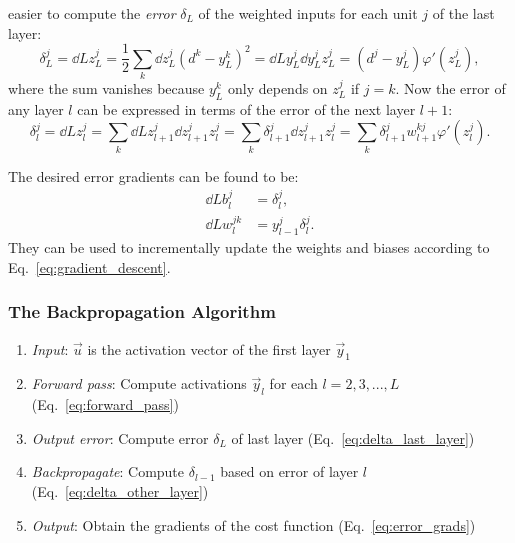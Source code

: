 easier to compute the \emph{error} $\delta_L$ of the weighted inputs for each
unit $j$ of the last layer:
\begin{equation}
  \delta^j_L = \dd{L}{z^j_L} = \frac{1}{2}\sum_k \dd{}{z^j_L}(d^k - y^k_L)^2
             = \dd{L}{y^j_L}\dd{y^j_L}{z^j_L}
             = (d^j - y^j_L) \varphi'(z^j_L) \label{eq:delta_last_layer},
\end{equation}
where the sum vanishes because $y^k_L$ only depends on $z^j_L$ if $j = k$.
Now the error of any layer $l$ can be expressed in terms of the error of the
next layer $l+1$:
\begin{equation}
  \delta^j_{l} = \dd{L}{z^j_l} = \sum_k \dd{L}{z^j_{l+1}}\dd{z^j_{l+1}}{z^j_l}
  = \sum_k \delta^j_{l+1} \dd{z^j_{l+1}}{z^j_l}
  = \sum_k \delta^j_{l+1} w^{kj}_{l+1} \varphi'(z^j_l). \label{eq:delta_other_layer}
\end{equation}

The desired error gradients can be found to be:
\begin{equation}
\begin{aligned}
  \dd{L}{b^j_l} &= \delta^j_l, \\
  \dd{L}{w^{jk}_l} &= y^j_{l-1} \delta^j_l. \label{eq:error_grads}
\end{aligned}
\end{equation}
They can be used to incrementally update the weights and biases according
to Eq.~\ref{eq:gradient_descent}.

\subsubsection{The Backpropagation Algorithm}%
\label{ssub:the_backpropagation_algorithm}

\begin{enumerate}
  \item \emph{Input}: $\vec{u}$ is the activation vector of the first layer
    $\vec{y}_1$
  \item \emph{Forward pass}: Compute activations $\vec{y}_l$ for each
    $l=2,3,...,L$ (Eq.~\ref{eq:forward_pass})
  \item \emph{Output error}: Compute error $\delta_L$ of last layer
    (Eq.~\ref{eq:delta_last_layer})
  \item \emph{Backpropagate}: Compute $\delta_{l-1}$ based on error of layer
    $l$ (Eq.~\ref{eq:delta_other_layer})
  \item \emph{Output}: Obtain the gradients of the cost function
    (Eq.~\ref{eq:error_grads})
\end{enumerate}
